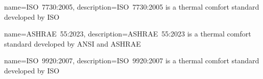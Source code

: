 \usepackage[nonumberlist,nogroupskip]{glossaries}


{
name={ISO~7730:2005},
description={ISO~7730:2005 is a thermal comfort standard developed by ISO}
}

{
name={ASHRAE~55:2023},
description={ASHRAE~55:2023 is a thermal comfort standard developed by ANSI and ASHRAE}
}

{
name={ISO~9920:2007},
description={ISO~9920:2007 is a thermal comfort standard developed by ISO}
}